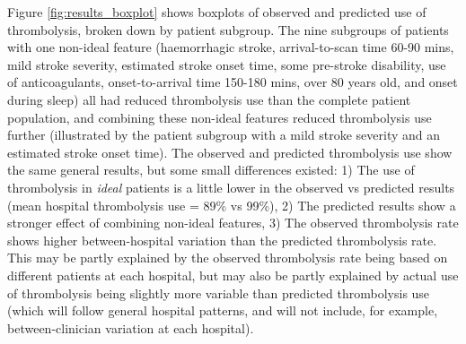 Figure \ref{fig:results_boxplot} shows boxplots of observed and predicted use of thrombolysis, broken down by patient subgroup. The nine subgroups of patients with one non-ideal feature (haemorrhagic stroke, arrival-to-scan time 60-90 mins, mild stroke severity, estimated stroke onset time, some pre-stroke disability, use of anticoagulants, onset-to-arrival time 150-180 mins, over 80 years old, and onset during sleep) all had reduced thrombolysis use than the complete patient population, and combining these non-ideal features reduced thrombolysis use further (illustrated by the patient subgroup with a mild stroke severity and an estimated stroke onset time). The observed and predicted thrombolysis use show the same general results, but some small differences existed: 1) The use of thrombolysis in \emph{ideal} patients is a little lower in the observed vs predicted results (mean hospital thrombolysis use = 89\% vs 99\%), 2) The predicted results show a stronger effect of combining non-ideal features, 3) The observed thrombolysis rate shows higher between-hospital variation than the predicted thrombolysis rate. This may be partly explained by the observed thrombolysis rate being based on different patients at each hospital, but may also be partly explained by actual use of thrombolysis being slightly more variable than predicted thrombolysis use (which will follow general hospital patterns, and will not include, for example, between-clinician variation at each hospital).



